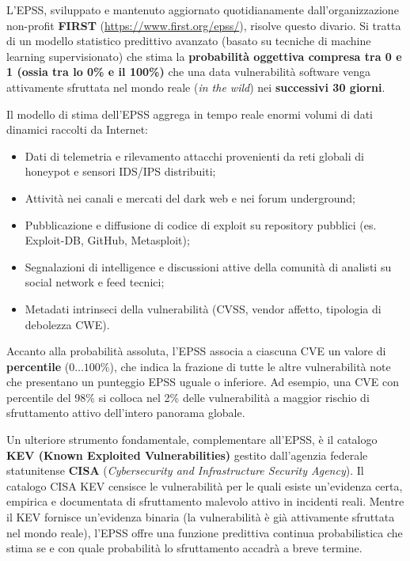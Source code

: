 \documentclass[../../main.tex]{subfiles}
\begin{document}
L'EPSS, sviluppato e mantenuto aggiornato quotidianamente dall'organizzazione non-profit \textbf{FIRST} (\url{https://www.first.org/epss/}), risolve questo divario. Si tratta di un modello statistico predittivo avanzato (basato su tecniche di machine learning supervisionato) che stima la \textbf{probabilità oggettiva compresa tra 0 e 1 (ossia tra lo 0\% e il 100\%)} che una data vulnerabilità software venga attivamente sfruttata nel mondo reale (\textit{in the wild}) nei \textbf{successivi 30 giorni}.

Il modello di stima dell'EPSS aggrega in tempo reale enormi volumi di dati dinamici raccolti da Internet:
\begin{itemize}
    \item Dati di telemetria e rilevamento attacchi provenienti da reti globali di honeypot e sensori IDS/IPS distribuiti;
    \item Attività nei canali e mercati del dark web e nei forum underground;
    \item Pubblicazione e diffusione di codice di exploit su repository pubblici (es. Exploit-DB, GitHub, Metasploit);
    \item Segnalazioni di intelligence e discussioni attive della comunità di analisti su social network e feed tecnici;
    \item Metadati intrinseci della vulnerabilità (CVSS, vendor affetto, tipologia di debolezza CWE).
\end{itemize}

Accanto alla probabilità assoluta, l'EPSS associa a ciascuna CVE un valore di \textbf{percentile} ($0 \dots 100\%$), che indica la frazione di tutte le altre vulnerabilità note che presentano un punteggio EPSS uguale o inferiore. Ad esempio, una CVE con percentile del 98\% si colloca nel 2\% delle vulnerabilità a maggior rischio di sfruttamento attivo dell'intero panorama globale.

Un ulteriore strumento fondamentale, complementare all'EPSS, è il catalogo \textbf{KEV (Known Exploited Vulnerabilities)} gestito dall'agenzia federale statunitense \textbf{CISA} (\textit{Cybersecurity and Infrastructure Security Agency}). Il catalogo CISA KEV censisce le vulnerabilità per le quali esiste un'evidenza certa, empirica e documentata di sfruttamento malevolo attivo in incidenti reali. Mentre il KEV fornisce un'evidenza binaria (la vulnerabilità è già attivamente sfruttata nel mondo reale), l'EPSS offre una funzione predittiva continua probabilistica che stima se e con quale probabilità lo sfruttamento accadrà a breve termine.
\end{document}
